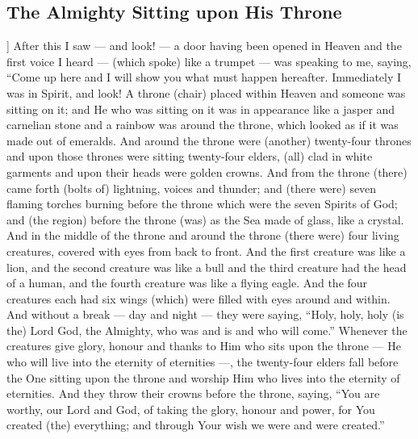 \begin{pages}
\begin{Leftside}
        			\chapter{The Almighty Sitting upon His Throne}
				]
		After this I saw — and look! — a door having been opened in Heaven and the first voice I heard — (which spoke) like a trumpet — was speaking to me, saying, “Come up here and I will show you what must happen hereafter. Immediately I was in Spirit, and look! A throne (chair) placed within Heaven and someone was sitting on it; and He who was sitting on it was in appearance like a jasper and carnelian stone and a rainbow was around the throne, which looked as if it was made out of emeralds. And around the throne were (another) twenty-four thrones and upon those thrones were sitting twenty-four elders, (all) clad in white garments and upon their heads were golden crowns. And from the throne (there) came forth (bolts of) lightning, voices and thunder; and (there were) seven flaming torches burning before the throne which were the seven Spirits of God; and (the region) before the throne (was) as the Sea made of glass, like a crystal.
		\pend
		\pstart
		And in the middle of the throne and around the throne (there were) four living creatures, covered with eyes from back to front. And the first creature was like a lion, and the second creature was like a bull and the third creature had the head of a human, and the fourth creature was like a flying eagle. And the four creatures each had six wings (which) were filled with eyes around and within. And without a break — day and night — they were saying, “Holy, holy, holy (is the) Lord God, the Almighty, who was and is and who will come.”
		\pend
		\pstart
		Whenever the creatures give glory, honour and thanks to Him who sits upon the throne — He who will live into the eternity of eternities —, the twenty-four elders fall before the One sitting upon the throne and worship Him who lives into the eternity of eternities. And they throw their crowns before the throne, saying, “You are worthy, our Lord and God, of taking the glory, honour and power, for You created (the) everything; and through Your wish we were and were created.”
		\pend
        \endnumbering
    \end{Leftside}

\end{pages} 
\Pages